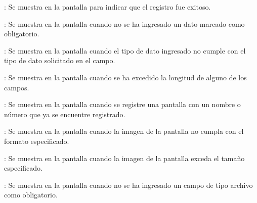 \begin{Citemize}
	\item {}: Se muestra en la pantalla  para indicar que el registro fue exitoso.
	\item {}: Se muestra en la pantalla  cuando no se ha ingresado un dato marcado como obligatorio.
	\item {}: Se muestra en la pantalla  cuando el tipo de dato ingresado no cumple con el tipo de dato solicitado en el campo.
	\item {}: Se muestra en la pantalla  cuando se ha excedido la longitud de alguno de los campos.
	\item {}: Se muestra en la pantalla  cuando se registre una pantalla con un nombre o número que ya se encuentre registrado.
	\item {}: Se muestra en la pantalla  cuando la imagen de la pantalla no cumpla con el formato especificado.
	\item {}: Se muestra en la pantalla  cuando la imagen de la pantalla exceda el tamaño especificado.
	\item {}: Se muestra en la pantalla  cuando no se ha ingresado un campo de tipo archivo como obligatorio.
\end{Citemize}
